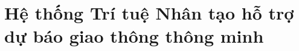 \section{Hệ thống Trí tuệ Nhân tạo hỗ trợ dự báo giao thông thông minh}
\label{ch:he_thong_tri_tue_nhan_tao}







